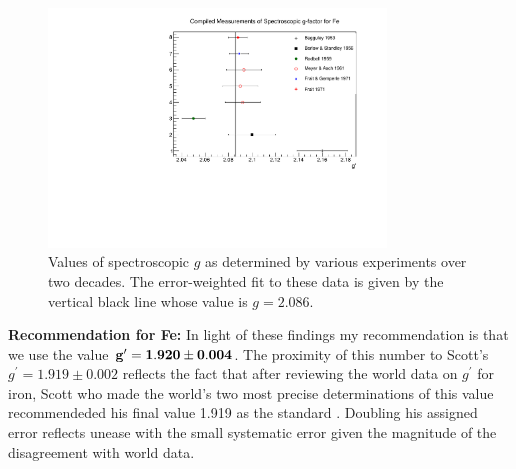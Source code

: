\documentclass[12pt]{article}
\begin{document}
\begin{figure}[h]
\centering
\includegraphics[width=0.8\textwidth]{gfactor_world_data_Fe.pdf}
\caption{Values of spectroscopic $g$ as determined by various experiments over two decades. The error-weighted fit to these data is given by the vertical black line whose value is $g=2.086$.}
\label{fig:gfactor_world_data_Fe}
\end{figure}

{\bf Recommendation for Fe:} In light of these findings my recommendation is that we use the value { $\bf g^{\prime}=1.920\pm0.004$}. The proximity of this number to Scott's $g^{\prime}=1.919\pm0.002$ reflects the fact that after reviewing the world data on $g^{\prime}$ for iron, Scott who made the world's two most precise determinations of this value recommendeded his final value 1.919 as the standard \cite{Scott1962}. Doubling his assigned error reflects unease with the small systematic error given the magnitude of the disagreement with world data.
\end{document}
